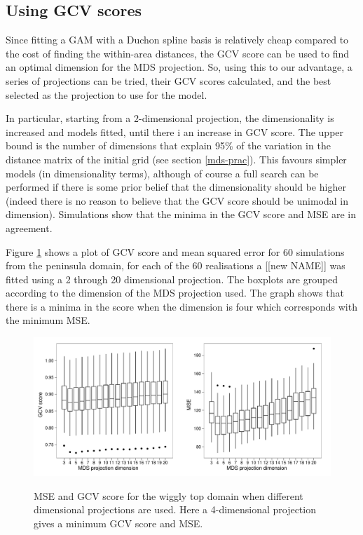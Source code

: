 \subsection{Using GCV scores}

Since fitting a GAM with a Duchon spline basis is relatively cheap compared to the cost of finding the within-area distances, the GCV score can be used to find an optimal dimension for the MDS projection. So, using this to our advantage, a series of projections can be tried, their GCV scores calculated, and the best selected as the projection to use for the model.

In particular, starting from a 2-dimensional projection, the dimensionality is increased  and models fitted, until there i an increase in GCV score. The upper bound is the number of dimensions that explain 95\% of the variation in the distance matrix of the initial grid (see section \ref{mds-prac}).  This favours simpler models (in dimensionality terms), although of course a full search can be performed if there is some prior belief that the dimensionality should be higher (indeed there is no reason to believe that the GCV score should be unimodal in dimension). Simulations show that the minima in the GCV score and MSE are in agreement.

Figure \ref{wt2-gcv-projdim-boxplot} shows a plot of GCV score and mean squared error for 60 simulations from the peninsula domain, for each of the 60 realisations a [[new NAME]] was fitted using a 2 through 20 dimensional projection. The boxplots are grouped according to the dimension of the MDS projection used. The graph shows that there is a minima in the score when the dimension is four which corresponds with the minimum MSE.

\begin{figure}
\centering
\includegraphics[width=6in]{mds/figs/wt2-gcv-projdim-boxplot.pdf} \\
\caption{MSE and GCV score for the wiggly top domain when different dimensional projections are used. Here a 4-dimensional projection gives a minimum GCV score and MSE.}
\label{wt2-gcv-projdim-boxplot}
\end{figure}

